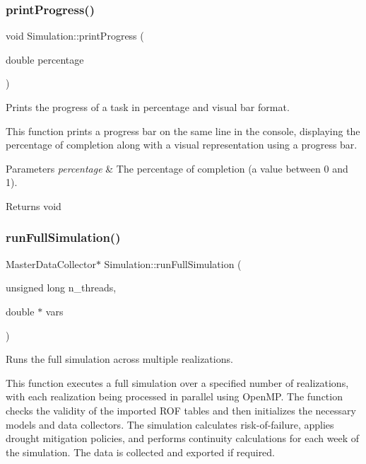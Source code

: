 \subsubsection{\texorpdfstring{print\+Progress()}{printProgress()}}
{\footnotesize\ttfamily void Simulation\+::print\+Progress (\begin{DoxyParamCaption}\item[{double}]{percentage }\end{DoxyParamCaption})}



Prints the progress of a task in percentage and visual bar format. 

This function prints a progress bar on the same line in the console, displaying the percentage of completion along with a visual representation using a progress bar.


\begin{DoxyParams}{Parameters}
{\em percentage} & The percentage of completion (a value between 0 and 1).\\
\hline
\end{DoxyParams}
\begin{DoxyReturn}{Returns}
void 
\end{DoxyReturn}
\mbox{\label{classSimulation_a401edb8c7e3390fee0340212993bcd79}} 
\subsubsection{\texorpdfstring{run\+Full\+Simulation()}{runFullSimulation()}}
{\footnotesize\ttfamily Master\+Data\+Collector$\ast$ Simulation\+::run\+Full\+Simulation (\begin{DoxyParamCaption}\item[{unsigned long}]{n\+\_\+threads,  }\item[{double $\ast$}]{vars }\end{DoxyParamCaption})}



Runs the full simulation across multiple realizations. 

This function executes a full simulation over a specified number of realizations, with each realization being processed in parallel using Open\+MP. The function checks the validity of the imported R\+OF tables and then initializes the necessary models and data collectors. The simulation calculates risk-\/of-\/failure, applies drought mitigation policies, and performs continuity calculations for each week of the simulation. The data is collected and exported if required.


